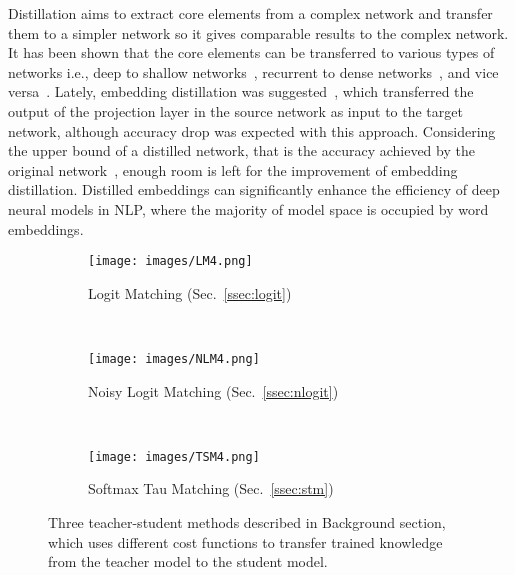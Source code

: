 \documentclass{article}
\begin{document}
\noindent Distillation aims to extract core elements from a complex network and transfer them to a simpler network so it gives comparable results to the complex network.
It has been shown that the core elements can be transferred to various types of networks i.e., deep to shallow networks~\cite{ba2014deep}, recurrent to dense networks~\cite{chan2015transferring}, and vice versa~\cite{romero2014fitnets,tang2016recurrent}. 
Lately, embedding distillation was suggested~\cite{mou2016distilling}, which transferred the output of the projection layer in the source network as input to the target network, although accuracy drop was expected with this approach.
Considering the upper bound of a distilled network, that is the accuracy achieved by the original network~\cite{ba2014deep}, enough room is left for the improvement of embedding distillation. Distilled embeddings can significantly enhance the efficiency of deep neural models in NLP, where the majority of model space is occupied by word embeddings.
\begin{figure*}[hbtp!]
	\centering
	\begin{subfigure}[b]{0.3\textwidth}
		\centering
\texttt{[image: images/LM4.png]}
		\caption{Logit Matching (Sec.~\ref{ssec:logit})}
		\label{fig:model.lm}
	\end{subfigure}~~~~~~~~ 
	\begin{subfigure}[b]{0.3\textwidth}
		\centering
\texttt{[image: images/NLM4.png]}
		\caption{Noisy Logit Matching (Sec.~\ref{ssec:nlogit})}
		\label{fig:model.nlm}
	\end{subfigure}~~~~~~~~
	\begin{subfigure}[b]{0.3\textwidth}
		\centering
\texttt{[image: images/TSM4.png]}
		\caption{Softmax Tau Matching (Sec.~\ref{ssec:stm})}
		\label{fig:model.tsm}
	\end{subfigure}\caption{Three teacher-student methods described in Background section, which uses different cost functions to transfer trained knowledge from the teacher model to the student model.}
	\label{fig:teachter-student}
	\vspace{-1ex}
\end{figure*}
\end{document}
